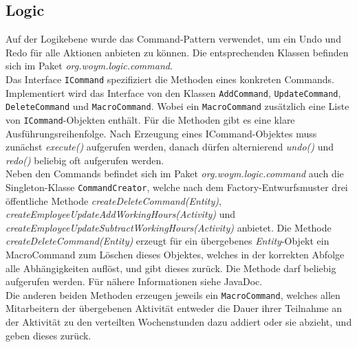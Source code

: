 \documentclass[fontsize=12pt,paper=a4,twoside]{scrartcl}
\begin{document}
\subsection{Logic}
\label{subsec:logic}
Auf der Logikebene wurde das Command-Pattern verwendet, um ein Undo und Redo für alle Aktionen anbieten zu können. Die entsprechenden Klassen befinden sich im Paket \textit{org.woym.logic.command}. \\
Das Interface \texttt{ICommand} spezifiziert die Methoden eines konkreten Commands. Implementiert wird das Interface von den Klassen \texttt{AddCommand}, \texttt{UpdateCommand}, \texttt{DeleteCommand} und \texttt{MacroCommand}. Wobei ein \texttt{MacroCommand} zusätzlich eine Liste von \texttt{ICommand}-Objekten enthält. Für die Methoden gibt es eine klare Ausführungsreihenfolge. Nach Erzeugung eines ICommand-Objektes muss zunächst \textit{execute()} aufgerufen werden, danach dürfen alternierend \textit{undo()} und \textit{redo()} beliebig oft aufgerufen werden. \\

Neben den Commands befindet sich im Paket \textit{org.woym.logic.command} auch die Singleton-Klasse \texttt{CommandCreator}, welche nach dem Factory-Entwurfsmuster drei öffentliche Methode \textit{createDeleteCommand(Entity)}, \textit{createEmployeeUpdateAddWorkingHours(Activity)} und \textit{createEmployeeUpdateSubtractWorkingHours(Activity)} anbietet. Die Methode \textit{createDeleteCommand(Entity)} erzeugt für ein übergebenes \textit{Entity}-Objekt ein MacroCommand zum Löschen dieses Objektes, welches in der korrekten Abfolge alle Abhängigkeiten auflöst, und gibt dieses zurück. Die Methode darf beliebig aufgerufen werden. Für nähere Informationen siehe JavaDoc.\\
Die anderen beiden Methoden erzeugen jeweils ein \texttt{MacroCommand}, welches allen Mitarbeitern der übergebenen Aktivität entweder die Dauer ihrer Teilnahme an der Aktivität zu den verteilten Wochenstunden dazu addiert oder sie abzieht, und geben dieses zurück.\\
\end{document}
